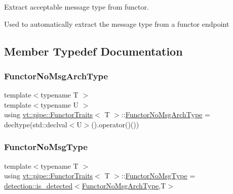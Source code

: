 Extract acceptable message type from functor. 

Used to automatically extract the message type from a functor endpoint 

\subsection{Member Typedef Documentation}
\mbox{\label{structvt_1_1pipe_1_1_functor_traits_af2002cb6723439f6b1e74c7a70255cc8}} 
\subsubsection{\texorpdfstring{Functor\+No\+Msg\+Arch\+Type}{FunctorNoMsgArchType}}
{\footnotesize\ttfamily template$<$typename T $>$ \\
template$<$typename U $>$ \\
using \hyperlink{structvt_1_1pipe_1_1_functor_traits}{vt\+::pipe\+::\+Functor\+Traits}$<$ T $>$\+::\hyperlink{structvt_1_1pipe_1_1_functor_traits_af2002cb6723439f6b1e74c7a70255cc8}{Functor\+No\+Msg\+Arch\+Type} =  decltype(std\+::declval$<$U$>$().operator()())}

\mbox{\label{structvt_1_1pipe_1_1_functor_traits_a2b729de8c328206718e4eea1d9b30f9b}} 
\subsubsection{\texorpdfstring{Functor\+No\+Msg\+Type}{FunctorNoMsgType}}
{\footnotesize\ttfamily template$<$typename T $>$ \\
using \hyperlink{structvt_1_1pipe_1_1_functor_traits}{vt\+::pipe\+::\+Functor\+Traits}$<$ T $>$\+::\hyperlink{structvt_1_1pipe_1_1_functor_traits_a2b729de8c328206718e4eea1d9b30f9b}{Functor\+No\+Msg\+Type} =  \hyperlink{namespacedetection_a30893549a3de1e9603d78dad6d5dce92}{detection\+::is\+\_\+detected}$<$\hyperlink{structvt_1_1pipe_1_1_functor_traits_af2002cb6723439f6b1e74c7a70255cc8}{Functor\+No\+Msg\+Arch\+Type},T$>$}



